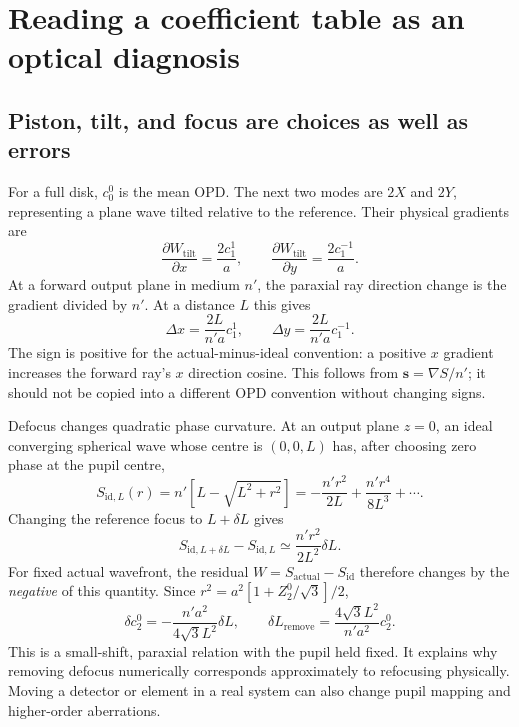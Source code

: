 \chapter{Reading a coefficient table as an optical diagnosis}
\label{zc:interpretation}

\section{Piston, tilt, and focus are choices as well as errors}
For a full disk, $c_0^0$ is the mean OPD. The next two modes are
$2X$ and $2Y$, representing a plane wave tilted relative to the reference.
Their physical gradients are
\begin{equation}
 \frac{\partial W_{\mathrm{tilt}}}{\partial x}=
 \frac{2c_1^1}{a},\qquad
 \frac{\partial W_{\mathrm{tilt}}}{\partial y}=
 \frac{2c_1^{-1}}{a}.
\end{equation}
At a forward output plane in medium $n'$, the paraxial ray direction
change is the gradient divided by $n'$. At a distance $L$ this gives
\begin{equation}
 \Delta x=\frac{2L}{n'a}c_1^1,\qquad
 \Delta y=\frac{2L}{n'a}c_1^{-1}.
 \label{zc:tiltshift}
\end{equation}
The sign is positive for the actual-minus-ideal convention: a positive
$x$ gradient increases the forward ray's $x$ direction cosine.
This follows from $\bm s=\nabla S/n'$; it should not be copied into a
different OPD convention without changing signs.

Defocus changes quadratic phase curvature. At an output plane $z=0$,
an ideal converging spherical wave whose centre is $(0,0,L)$ has, after
choosing zero phase at the pupil centre,
\begin{equation}
 S_{\mathrm{id},L}(r)=n'\left[L-\sqrt{L^2+r^2}\right]
           =-\frac{n'r^2}{2L}+\frac{n'r^4}{8L^3}+\cdots.
\end{equation}
Changing the reference focus to $L+\delta L$ gives
\begin{equation}
 S_{\mathrm{id},L+\delta L}-S_{\mathrm{id},L}
       \simeq\frac{n'r^2}{2L^2}\delta L.
\end{equation}
For fixed actual wavefront, the residual $W=S_{\mathrm{actual}}-S_{\mathrm{id}}$
therefore changes by the \emph{negative} of this quantity. Since
$r^2=a^2[1+Z_2^0/\sqrt3]/2$,
\begin{equation}
 \delta c_2^0=-\frac{n'a^2}{4\sqrt3L^2}\delta L,
 \qquad
 \delta L_{\mathrm{remove}}=
        \frac{4\sqrt3L^2}{n'a^2}c_2^0.
 \label{zc:focusshift}
\end{equation}
This is a small-shift, paraxial relation with the pupil held fixed. It
explains why removing defocus numerically corresponds approximately to
refocusing physically. Moving a detector or element in a real system
can also change pupil mapping and higher-order aberrations.

